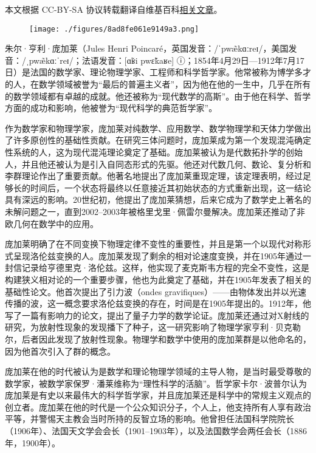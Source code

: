 
本文根据 CC-BY-SA 协议转载翻译自维基百科\href{https://en.wikipedia.org/wiki/Carl_Friedrich_Gauss}{相关文章}。

\begin{figure}[ht]
\centering
\texttt{[image: ./figures/8ad8fe061e9149a3.png]}
\caption{} \label{fig_HLPJL_1}
\end{figure}
朱尔·亨利·庞加莱（Jules Henri Poincaré，英国发音：/ˈpwæ̃kɑːreɪ/，美国发音：/ˌpwæ̃kɑːˈreɪ/；法语发音：[ɑ̃ʁi pwɛ̃kaʁe] ⓘ；1854年4月29日—1912年7月17日）是法国的数学家、理论物理学家、工程师和科学哲学家。他常被称为博学多才的人，在数学领域被誉为“最后的普遍主义者”，因为他在他的一生中，几乎在所有的数学领域都有卓越的成就。他还被称为“现代数学的高斯”。由于他在科学、哲学方面的成功和影响，他被誉为“现代科学的典范哲学家”。

作为数学家和物理学家，庞加莱对纯数学、应用数学、数学物理学和天体力学做出了许多原创性的基础性贡献。在研究三体问题时，庞加莱成为第一个发现混沌确定性系统的人，这为现代混沌理论奠定了基础。庞加莱被认为是代数拓扑学的创始人，并且他还被认为是引入自同态形式的先驱。他还对代数几何、数论、复分析和李群理论作出了重要贡献。他著名地提出了庞加莱重现定理，该定理表明，经过足够长的时间后，一个状态将最终以任意接近其初始状态的方式重新出现，这一结论具有深远的影响。20世纪初，他提出了庞加莱猜想，后来它成为了数学史上著名的未解问题之一，直到2002–2003年被格里戈里·佩雷尔曼解决。庞加莱还推动了非欧几何在数学中的应用。

庞加莱明确了在不同变换下物理定律不变性的重要性，并且是第一个以现代对称形式呈现洛伦兹变换的人。庞加莱发现了剩余的相对论速度变换，并在1905年通过一封信记录给亨德里克·洛伦兹。这样，他实现了麦克斯韦方程的完全不变性，这是构建狭义相对论的一个重要步骤，他也为此奠定了基础，并在1905年发表了相关的基础性论文。他首次提出了引力波（ondes gravifiques）——由物体发出并以光速传播的波，这一概念要求洛伦兹变换的存在，时间是在1905年提出的。1912年，他写了一篇有影响力的论文，提出了量子力学的数学论证。庞加莱还通过对X射线的研究，为放射性现象的发现播下了种子，这一研究影响了物理学家亨利·贝克勒尔，后者因此发现了放射性现象。物理学和数学中使用的庞加莱群是以他命名的，因为他首次引入了群的概念。

庞加莱在他的时代被认为是数学和理论物理学领域的主导人物，是当时最受尊敬的数学家，被数学家保罗·潘莱维称为“理性科学的活脑”。哲学家卡尔·波普尔认为庞加莱是有史以来最伟大的科学哲学家，并且庞加莱还是科学中的常规主义观点的创立者。庞加莱在他的时代是一个公众知识分子，个人上，他支持所有人享有政治平等，并警惕天主教会当时所持的反智立场的影响。他曾担任法国科学院院长（1906年）、法国天文学会会长（1901–1903年），以及法国数学会两任会长（1886年，1900年）。
